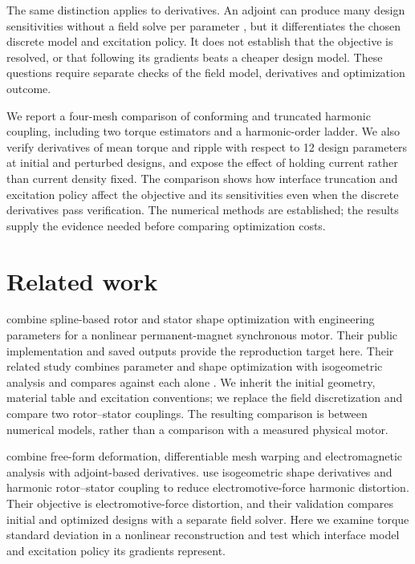 \documentclass{anvil-paper}
\begin{document}
The same distinction applies to derivatives. An adjoint can produce many
design sensitivities without a field solve per parameter
\citep{scotzniovsky2025}, but it differentiates the chosen discrete model
and excitation policy. It does not establish that the objective is
resolved, or that following its gradients beats a cheaper design model.
These questions require separate checks of the field model, derivatives
and optimization outcome.

We report a four-mesh comparison of conforming and truncated harmonic
coupling, including two torque estimators and a harmonic-order ladder.
We also verify derivatives of mean torque and ripple with respect to
12 design parameters at initial and perturbed designs, and expose the
effect of holding current rather than current density fixed. The
comparison shows how interface truncation and excitation policy affect
the objective and its sensitivities even when the discrete derivatives pass
verification. The numerical methods are established; the results supply
the evidence needed before comparing optimization costs.

\section{Related work}
\citet{wiesheu2024spline} combine spline-based rotor and stator shape
optimization with engineering parameters for a nonlinear permanent-magnet
synchronous motor. Their public implementation and saved outputs provide
the reproduction target here. Their related study combines parameter and
shape optimization with isogeometric analysis and compares against each alone
\citep{wiesheu2025combined}. We inherit the initial geometry, material
table and excitation conventions; we replace the field discretization and compare two
rotor--stator couplings. The resulting comparison is between numerical
models, rather than a comparison with a measured physical motor.

\citet{scotzniovsky2025} combine free-form deformation, differentiable
mesh warping and electromagnetic analysis with adjoint-based derivatives.
\citet{merkel2021shape} use isogeometric shape derivatives and harmonic
rotor--stator coupling to reduce electromotive-force harmonic distortion.
Their objective is electromotive-force distortion, and their validation
compares initial and optimized designs with a separate field solver.
Here we examine torque standard deviation in a nonlinear reconstruction
and test which interface model and excitation policy its gradients represent.
\end{document}
